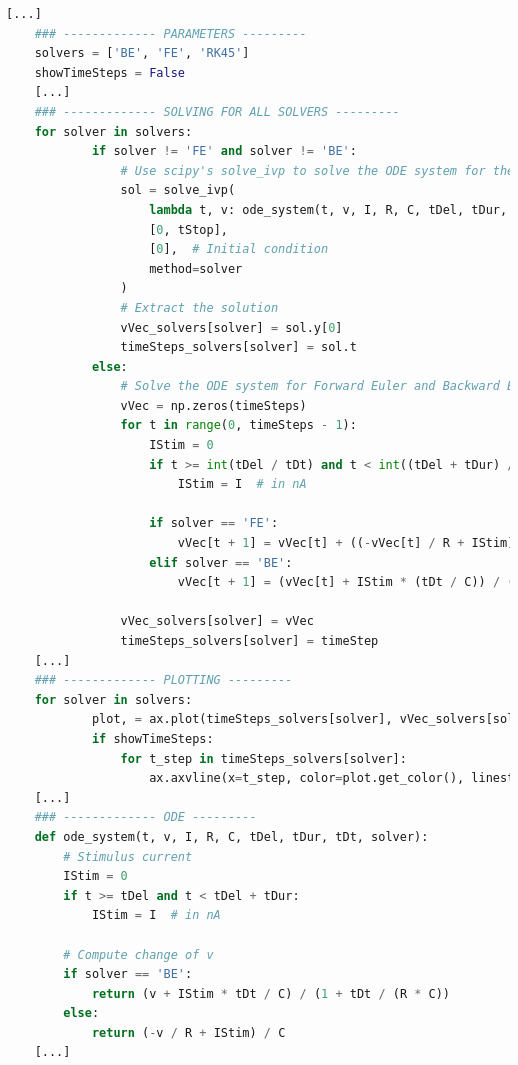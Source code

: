 \documentclass{article}
\begin{document}
    \begin{lstlisting}[language=Python, style=mystyle]
    [...]
    ### ------------- PARAMETERS ---------
    solvers = ['BE', 'FE', 'RK45']
    showTimeSteps = False
    [...]
    ### ------------- SOLVING FOR ALL SOLVERS ---------
    for solver in solvers:
            if solver != 'FE' and solver != 'BE':
                # Use scipy's solve_ivp to solve the ODE system for the built-in solver
                sol = solve_ivp(
                    lambda t, v: ode_system(t, v, I, R, C, tDel, tDur, tDt, solver),
                    [0, tStop],
                    [0],  # Initial condition
                    method=solver
                )
                # Extract the solution
                vVec_solvers[solver] = sol.y[0]
                timeSteps_solvers[solver] = sol.t
            else:
                # Solve the ODE system for Forward Euler and Backward Euler
                vVec = np.zeros(timeSteps)
                for t in range(0, timeSteps - 1):
                    IStim = 0
                    if t >= int(tDel / tDt) and t < int((tDel + tDur) / tDt):
                        IStim = I  # in nA

                    if solver == 'FE':
                        vVec[t + 1] = vVec[t] + ((-vVec[t] / R + IStim) / C) * tDt
                    elif solver == 'BE':
                        vVec[t + 1] = (vVec[t] + IStim * (tDt / C)) / (1 + tDt / (R * C))

                vVec_solvers[solver] = vVec
                timeSteps_solvers[solver] = timeStep
    [...]
    ### ------------- PLOTTING ---------
    for solver in solvers:
            plot, = ax.plot(timeSteps_solvers[solver], vVec_solvers[solver], label=solver+' Nr. Timesteps='+str(timeSteps_solvers[solver].size))
            if showTimeSteps:
                for t_step in timeSteps_solvers[solver]:
                    ax.axvline(x=t_step, color=plot.get_color(), linestyle='--', linewidth=0.8)
    [...]
    ### ------------- ODE ---------
    def ode_system(t, v, I, R, C, tDel, tDur, tDt, solver):
        # Stimulus current
        IStim = 0
        if t >= tDel and t < tDel + tDur:
            IStim = I  # in nA

        # Compute change of v
        if solver == 'BE':
            return (v + IStim * tDt / C) / (1 + tDt / (R * C))
        else:
            return (-v / R + IStim) / C
    [...]
    \end{lstlisting}
\end{document}

